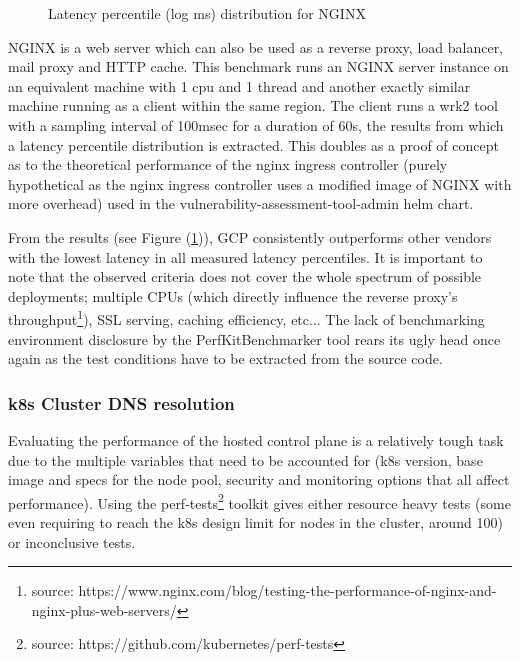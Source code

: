 \documentclass[11pt]{article}
\begin{document}

\begin{figure}[h]
    \centering
    
    \caption{Latency percentile (log ms) distribution for NGINX}
    \label{fig:bench_nginx}
\end{figure}

\vspace{-5mm}\hspace{5mm} NGINX is a web server which can also be used as a reverse proxy, load balancer, mail proxy and HTTP cache. This benchmark runs an NGINX server instance on an equivalent machine with 1 cpu and 1 thread and another exactly similar machine running as a client within the same region. The client runs a wrk2 tool with a sampling interval of 100msec for a duration of 60s, the results from which a latency percentile distribution is extracted. This doubles as a proof of concept as to the theoretical performance of the nginx ingress controller (purely hypothetical as the nginx ingress controller uses a modified image of NGINX with more overhead) used in the vulnerability-assessment-tool-admin helm chart. 

%     

From the results (see Figure (\ref{fig:bench_nginx})), GCP consistently outperforms other vendors with the lowest latency in all measured latency percentiles. It is important to note that the observed criteria does not cover the whole spectrum of possible deployments; multiple CPUs (which directly influence the reverse proxy's throughput\footnote{source: https://www.nginx.com/blog/testing-the-performance-of-nginx-and-nginx-plus-web-servers/}), SSL serving, caching efficiency, etc... The lack of benchmarking environment disclosure by the PerfKitBenchmarker tool rears its ugly head once again as the test conditions have to be extracted from the source code.

\subsubsection{k8s Cluster DNS resolution}

\hspace{5mm} Evaluating the performance of the hosted control plane is a relatively tough task due to the multiple variables that need to be accounted for (k8s version, base image and specs for the node pool, security and monitoring options that all affect performance). Using the perf-tests\footnote{source: https://github.com/kubernetes/perf-tests} toolkit gives either resource heavy tests (some even requiring to reach the k8s design limit for nodes in the cluster, around 100) or inconclusive tests. 
\end{document}
